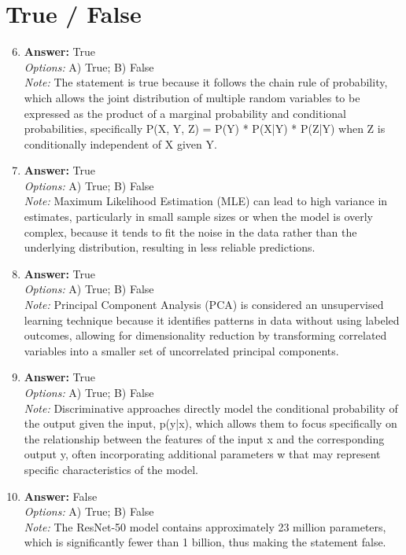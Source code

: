\documentclass[12pt]{article}
\begin{document}
\section*{True / False}
\begin{enumerate}[label=\arabic*.]
\setcounter{enumi}{5}
\item \textbf{Answer:} True
\\ \textit{Options:} A) True; B) False
\\ \textit{Note:} The statement is true because it follows the chain rule of probability, which allows the joint distribution of multiple random variables to be expressed as the product of a marginal probability and conditional probabilities, specifically P(X, Y, Z) = P(Y) * P(X|Y) * P(Z|Y) when Z is conditionally independent of X given Y.
\item \textbf{Answer:} True
\\ \textit{Options:} A) True; B) False
\\ \textit{Note:} Maximum Likelihood Estimation (MLE) can lead to high variance in estimates, particularly in small sample sizes or when the model is overly complex, because it tends to fit the noise in the data rather than the underlying distribution, resulting in less reliable predictions.
\item \textbf{Answer:} True
\\ \textit{Options:} A) True; B) False
\\ \textit{Note:} Principal Component Analysis (PCA) is considered an unsupervised learning technique because it identifies patterns in data without using labeled outcomes, allowing for dimensionality reduction by transforming correlated variables into a smaller set of uncorrelated principal components.
\item \textbf{Answer:} True
\\ \textit{Options:} A) True; B) False
\\ \textit{Note:} Discriminative approaches directly model the conditional probability of the output given the input, p(y|x), which allows them to focus specifically on the relationship between the features of the input x and the corresponding output y, often incorporating additional parameters w that may represent specific characteristics of the model.
\item \textbf{Answer:} False
\\ \textit{Options:} A) True; B) False
\\ \textit{Note:} The ResNet-50 model contains approximately 23 million parameters, which is significantly fewer than 1 billion, thus making the statement false.
\end{enumerate}
\end{document}
